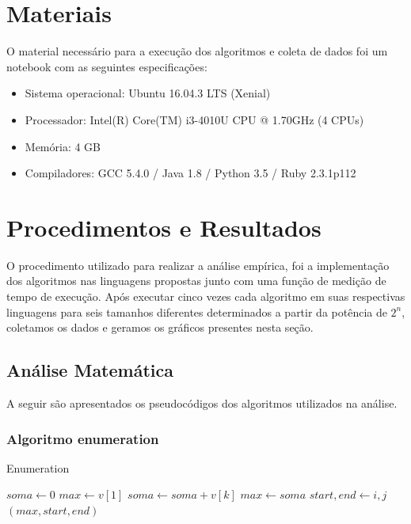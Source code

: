 \documentclass[
	12pt,				%
	oneside,   	        %
	a4paper,			%
	english,			%
	french,				%
	spanish,			%
	brazil,				%
	]{pacotes/abntex2}
\begin{document}
\section{Materiais}
\label{sec:materiais}
O material necessário para a execução dos algoritmos e coleta de dados foi um notebook com as seguintes especificações:
 \begin{itemize}
   \item Sistema operacional: Ubuntu 16.04.3 LTS (Xenial)
   \item Processador: Intel(R) Core(TM) i3-4010U CPU @ 1.70GHz (4 CPUs)
   \item Memória: 4 GB
   \item Compiladores: GCC 5.4.0 / Java 1.8 / Python 3.5 / Ruby 2.3.1p112
 \end{itemize}


\section{Procedimentos e Resultados}
\label{sec:procedimentos}

O  procedimento utilizado para realizar a análise empírica, foi a implementação dos algoritmos
nas linguagens propostas junto com uma função de medição de tempo de execução.
Após executar cinco vezes cada algoritmo em suas respectivas linguagens para seis tamanhos
diferentes determinados a partir da potência de  $2^{n}$, coletamos os dados e geramos os gráficos
presentes nesta seção.

\newpage
\subsection{Análise Matemática}
A seguir são apresentados os pseudocódigos dos algoritmos utilizados na análise.

\subsubsection{Algoritmo enumeration}
\begin{algorithm}
\caption{Enumeration}
\label{algo:preencheprimeiroarranjo}
\begin{algorithmic}[1]
        \State  $soma \gets 0$
        \State $max \gets v[1]$
                    \State $soma \gets soma+v[k]$
                \EndFor
                    \State $max \gets soma$
                    \State $start, end \gets i, j$
                \EndIf
            \EndFor
        \EndFor
        \State \Return $(max, start, end)$
    \EndFunction
\end{algorithmic}
\end{algorithm}
\end{document}

